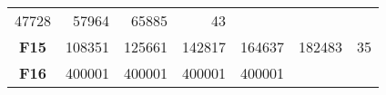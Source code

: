 \documentclass[12pt,a4paper]{article}
\begin{document}
\begin{longtable}[c]{@{}crrrrrr@{}}
\begin{minipage}[t]{0.09\columnwidth}
47728
\strut\end{minipage} &
\begin{minipage}[t]{0.10\columnwidth}\raggedleft\strut
57964
\strut\end{minipage} &
\begin{minipage}[t]{0.11\columnwidth}\raggedleft\strut
65885
\strut\end{minipage} &
\begin{minipage}[t]{0.07\columnwidth}\raggedleft\strut
43
\strut\end{minipage}\tabularnewline
\begin{minipage}[t]{0.11\columnwidth}\centering\strut
\textbf{F15}
\strut\end{minipage} &
\begin{minipage}[t]{0.08\columnwidth}\raggedleft\strut
108351
\strut\end{minipage} &
\begin{minipage}[t]{0.08\columnwidth}\raggedleft\strut
125661
\strut\end{minipage} &
\begin{minipage}[t]{0.09\columnwidth}\raggedleft\strut
142817
\strut\end{minipage} &
\begin{minipage}[t]{0.10\columnwidth}\raggedleft\strut
164637
\strut\end{minipage} &
\begin{minipage}[t]{0.11\columnwidth}\raggedleft\strut
182483
\strut\end{minipage} &
\begin{minipage}[t]{0.07\columnwidth}\raggedleft\strut
35
\strut\end{minipage}\tabularnewline
\begin{minipage}[t]{0.11\columnwidth}\centering\strut
\textbf{F16}
\strut\end{minipage} &
\begin{minipage}[t]{0.08\columnwidth}\raggedleft\strut
400001
\strut\end{minipage} &
\begin{minipage}[t]{0.08\columnwidth}\raggedleft\strut
400001
\strut\end{minipage} &
\begin{minipage}[t]{0.09\columnwidth}\raggedleft\strut
400001
\strut\end{minipage} &
\begin{minipage}[t]{0.10\columnwidth}\raggedleft\strut
400001
\strut\end{minipage} &
\begin{minipage}[t]{0.11\columnwidth}\raggedleft\strut

\end{minipage}
\end{longtable}
\end{document}
